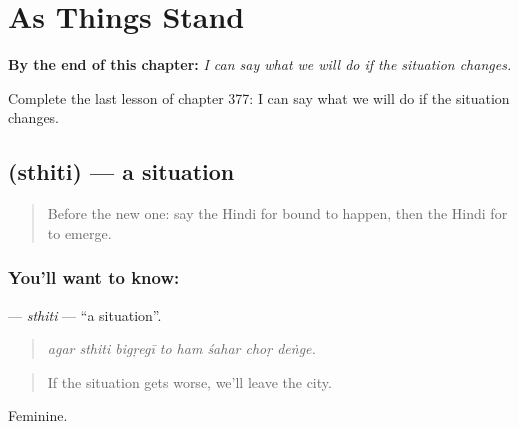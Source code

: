 
\chapter{As Things Stand}
\label{ch:hi-as-things-stand}

\begin{chapteropening}
\textbf{By the end of this chapter:} \emph{I can say what we will do if the situation changes.}

Complete the last lesson of chapter 377: I can say what we will do if the situation changes.
\end{chapteropening}

\section[\texorpdfstring{\hi{स्थिति} (sthiti)}{स्थिति (sthiti)}]{ (sthiti) — a situation}

\label{lesson:HI-C377-sthiti}



\begin{quote}
Before the new one: say the Hindi for bound to happen, then the Hindi for to emerge.
\end{quote}

\subsection*{You'll want to know: }
\textbf{} — \emph{sthiti} — \textquotedblleft{}a situation\textquotedblright{}.

\begin{quote}
       
\end{quote}

\begin{quote}
\emph{agar sthiti bigṛegī to ham śahar choṛ deṅge.}
\end{quote}

\begin{quote}
If the situation gets worse, we'll leave the city.
\end{quote}

Feminine.

